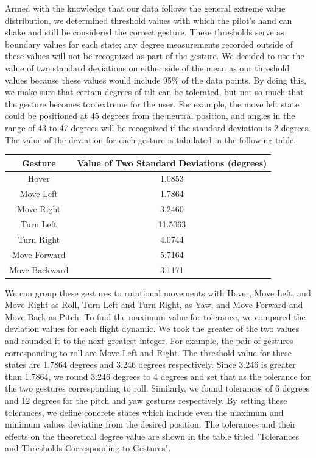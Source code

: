 \documentclass[letterpaper,english, 12pt]{article}
\begin{document}
Armed with the knowledge that our data follows the general extreme value distribution, we determined threshold values with which the pilot's hand can shake and still be considered the correct gesture. These thresholds serve as boundary values for each state; any degree measurements recorded outside of these values will not be recognized as part of the gesture. We decided to use the value of two standard deviations on either side of the mean as our threshold values because these values would include 95\% of the data points. By doing this, we make sure that certain degrees of tilt can be tolerated, but not so much that the gesture becomes too extreme for the user. For example, the move left state could be positioned at 45 degrees from the neutral position, and angles in the range of 43 to 47 degrees will be recognized if the standard deviation is 2 degrees. The value of the deviation for each gesture is tabulated in the following table.

\begin{center}
	\begin{tabular}{|c|c|} 
		\hline
			Gesture & Value of Two Standard Deviations (degrees) \\
		\hline
			Hover & 1.0853 \\
		\hline
			Move Left & 1.7864 \\
		\hline
			Move Right & 3.2460 \\
		\hline
			Turn Left & 11.5063 \\
		\hline
			Turn Right & 4.0744 \\
		\hline
			Move Forward & 5.7164 \\
		\hline
			Move Backward & 3.1171 \\
		\hline
	\end{tabular}
\end{center}

We can group these gestures to rotational movements with Hover, Move Left, and Move Right as Roll, Turn Left and Turn Right, as Yaw, and Move Forward and Move Back as Pitch. To find the maximum value for tolerance, we compared the deviation values for each flight dynamic. We took the greater of the two values and rounded it to the next greatest integer. For example, the pair of gestures corresponding to roll are Move Left and Right. The threshold value for these states are 1.7864 degrees and 3.246 degrees respectively. Since 3.246 is greater than 1.7864, we round 3.246 degrees to 4 degrees and set that as the tolerance for the two gestures corresponding to roll. Similarly, we found tolerances of 6 degrees and 12 degrees for the pitch and yaw gestures respectively. By setting these tolerances, we define concrete states which include even the maximum and minimum values deviating from the desired position. The tolerances and their effects on the theoretical degree value are shown in the table titled "Tolerances and Thresholds Corresponding to Gestures".
\end{document}
